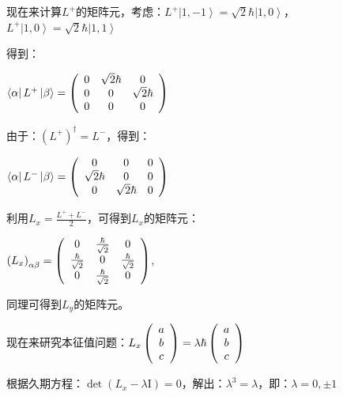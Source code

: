 \begin{enumerate}
现在来计算$L^+$的矩阵元，考虑：$L^+ \left|1,-1 \right> = \sqrt{2}
\hbar \left|1,0 \right>$，$L^+ \left|1,0 \right> = \sqrt{2} \hbar
\left|1,1 \right>$

得到：

$\left\langle \alpha  \right|L^ +  \left| \beta  \right\rangle  =
\left( {\begin{array}{*{20}c}
   0 & {\sqrt 2 \hbar } & 0  \\
   0 & 0 & {\sqrt 2 \hbar }  \\
   0 & 0 & 0  \\
\end{array}} \right)$

由于：$(L^+)^\dagger = L^-$，得到：

$\left\langle \alpha  \right|L^ -  \left| \beta  \right\rangle  =
\left( {\begin{array}{*{20}c}
   0 & 0 & 0  \\
   {\sqrt 2 \hbar } & 0 & 0  \\
   0 & {\sqrt 2 \hbar } & 0  \\
\end{array}} \right)$

利用$L_x = \frac{L^+ + L^-}{2}$，可得到$L_x$的矩阵元：


$\left( {L_x } \right)_{\alpha \beta }  = \left(
{\begin{array}{*{20}c}
   0 & {\frac{\hbar }{{\sqrt 2 }}} & 0  \\
   {\frac{\hbar }{{\sqrt 2 }}} & 0 & {\frac{\hbar }{{\sqrt 2 }}}  \\
   0 & {\frac{\hbar }{{\sqrt 2 }}} & 0  \\
\end{array}} \right)$,

同理可得到$L_y$的矩阵元。

现在来研究本征值问题：$L_x \left( {\begin{array}{*{20}c}
   a  \\
   b  \\
   c  \\
\end{array}} \right) = \lambda \hbar \left( {\begin{array}{*{20}c}
   a  \\
   b  \\
   c  \\
\end{array}} \right)$


根据久期方程：$\det (L_x - \lambda \text{I}) =0$，解出：$\lambda^3 =
\lambda$，即：$\lambda =0, \pm 1$



\end{enumerate}
